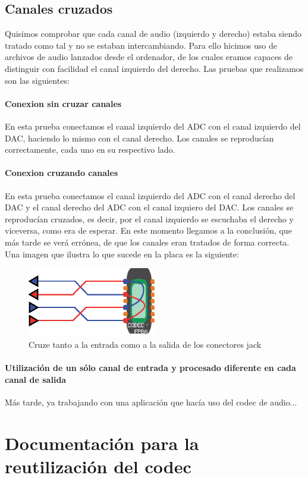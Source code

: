 	

	\subsection{Canales cruzados}

		Quisimos comprobar que cada canal de audio (izquierdo y derecho) estaba siendo tratado como tal y no se estaban intercambiando. Para ello hicimos uso de archivos de audio lanzados desde el ordenador, de los cuales eramos capaces de distinguir con facilidad el canal izquierdo del derecho. Las pruebas que realizamos son las siguientes:

		\paragraph{Conexion sin cruzar canales}
			En esta prueba conectamos el canal izquierdo del ADC con el canal izquierdo del DAC, haciendo lo mismo con el canal derecho. Los canales se reproducían correctamente, cada uno en su respectivo lado.


		\paragraph{Conexion cruzando canales}
			En esta prueba conectamos el canal izquierdo del ADC con el canal derecho del DAC y el canal derecho del ADC con el canal izquiero del DAC. Los canales se reproducían cruzados, es decir, por el canal izquierdo se escuchaba el derecho y viceversa, como era de esperar. En este momento llegamos a la conclusión, que más tarde se verá errónea, de que los canales eran tratados de forma correcta. Una imagen que ilustra lo que sucede en la placa es la siguiente:
\begin{figure}[h]
\begin{center}
	\includegraphics[width=0.5\textwidth]{./swapping_channels}
\caption{Cruze tanto a la entrada como a la salida de los conectores jack}
\end{center}
\end{figure}

		\paragraph{Utilización de un sólo canal de entrada y procesado diferente en cada canal de salida}
	
			Más tarde, ya trabajando con una aplicación que hacía uso del codec de audio...
			
		
	
\section{Documentación para la reutilización del codec}
	
